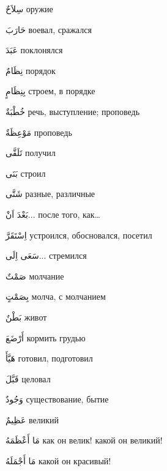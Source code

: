 \documentclass[a5paper]{article}
\newcommand\textstyleDropCaps[1]{#1}
\newcommand\textstyleCaptioncharacters[1]{#1}
\begin{document}
\textstyleCaptioncharacters{سِلاَحٌ }\textstyleDropCaps{оружие‎}

\textstyleCaptioncharacters{حَارَبَ }\textstyleDropCaps{воевал, сражался‎}

\textstyleCaptioncharacters{عَبَدَ }\textstyleDropCaps{поклонялся‎}

\textstyleCaptioncharacters{نِظَامٌ }\textstyleDropCaps{порядок‎}

\textstyleCaptioncharacters{بِنِظَامٍ }\textstyleDropCaps{строем, в порядке‎}

\textstyleCaptioncharacters{خُطْبَةٌ }\textstyleDropCaps{речь, выступление; проповедь‎}

\textstyleCaptioncharacters{مَوْعِظَةٌ }\textstyleDropCaps{проповедь‎}

\textstyleCaptioncharacters{تَلَقَّى }\textstyleDropCaps{получил‎}

\textstyleCaptioncharacters{بَنَى }\textstyleDropCaps{строил‎}

\textstyleCaptioncharacters{شَتَّى }\textstyleDropCaps{разные, различные‎}

\textstyleCaptioncharacters{بَعْدَ اَنْ... }\textstyleDropCaps{после того, как…‎}

\textstyleCaptioncharacters{اِسْتَقَرَّ }\textstyleDropCaps{устроился, обосно­вался, посетил‎}

\textstyleCaptioncharacters{سَعَى اِلَى... }\textstyleDropCaps{стремился‎}

\textstyleCaptioncharacters{صَمْتٌ }\textstyleDropCaps{молчание‎}

\textstyleCaptioncharacters{بِصَمْتٍ }\textstyleDropCaps{молча, с молчани­ем‎}

\textstyleCaptioncharacters{بَطْنٌ }\textstyleDropCaps{живот‎}

\textstyleCaptioncharacters{أَرْضَعَ }\textstyleDropCaps{кормить грудью‎}

\textstyleCaptioncharacters{هَيَّأَ }\textstyleDropCaps{готовил, подготовил‎}

\textstyleCaptioncharacters{قَبَّلَ }\textstyleDropCaps{целовал‎}

\textstyleCaptioncharacters{وَجُودٌ }\textstyleDropCaps{существование, бы­тие‎}

\textstyleCaptioncharacters{عَظِيمٌ }\textstyleDropCaps{великий‎}

\textstyleCaptioncharacters{مَا أَعْظَمَهُ }\textstyleDropCaps{как он велик! какой он великий!‎}

\textstyleCaptioncharacters{مَا أَجْمَلَهُ }\textstyleDropCaps{какой он кра­сивый!‎}
\end{document}
